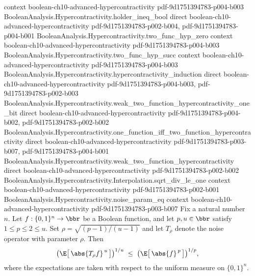\begin{theorem}
  {context}
  {boolean-ch10-advanced-hypercontractivity}
  {pdf-9d1751394783-p004-b003}
\proofstep
  {BooleanAnalysis.Hypercontractivity.holder_ineq_bool}
  {direct}
  {boolean-ch10-advanced-hypercontractivity}
  {pdf-9d1751394783-p002-b004,
    pdf-9d1751394783-p004-b001}
\proofstep
  {BooleanAnalysis.Hypercontractivity.two_func_hyp_zero}
  {context}
  {boolean-ch10-advanced-hypercontractivity}
  {pdf-9d1751394783-p004-b003}
\proofstep
  {BooleanAnalysis.Hypercontractivity.two_func_hyp_succ}
  {context}
  {boolean-ch10-advanced-hypercontractivity}
  {pdf-9d1751394783-p004-b003}
\proofstep
  {BooleanAnalysis.Hypercontractivity.hypercontractivity_induction}
  {direct}
  {boolean-ch10-advanced-hypercontractivity}
  {pdf-9d1751394783-p004-b003,
    pdf-9d1751394783-p002-b003}
\proofstep
  {BooleanAnalysis.Hypercontractivity.weak_two_function_hypercontractivity_one_bit}
  {direct}
  {boolean-ch10-advanced-hypercontractivity}
  {pdf-9d1751394783-p004-b002,
    pdf-9d1751394783-p002-b002}
\proofstep
  {BooleanAnalysis.Hypercontractivity.one_function_iff_two_function_hypercontractivity}
  {direct}
  {boolean-ch10-advanced-hypercontractivity}
  {pdf-9d1751394783-p003-b007,
    pdf-9d1751394783-p004-b001}
\proofstep
  {BooleanAnalysis.Hypercontractivity.weak_two_function_hypercontractivity}
  {direct}
  {boolean-ch10-advanced-hypercontractivity}
  {pdf-9d1751394783-p002-b002}
\proofstep
  {BooleanAnalysis.Hypercontractivity.Interpolation.sqrt_div_le_one}
  {context}
  {boolean-ch10-advanced-hypercontractivity}
  {pdf-9d1751394783-p002-b001}
\proofstep
  {BooleanAnalysis.Hypercontractivity.noise_param_eq}
  {context}
  {boolean-ch10-advanced-hypercontractivity}
  {pdf-9d1751394783-p003-b007}
Fix a natural number $n$. Let $f:\{0,1\}^n\to\bbr$ be a Boolean function, and let $p,u\in\bbr$ satisfy $1\le p\le
2\le u$. Set $\rho=\sqrt{(p-1)/(u-1)}$ and let $T_\rho$ denote the noise operator with
parameter $\rho$. Then
\[
  \bigl(\E\bigl[\,\abs{T_\rho f}^{\,u}\,\bigr]\bigr)^{1/u}
  \;\le\;
  \bigl(\E\bigl[\,\abs{f}^{\,p}\,\bigr]\bigr)^{1/p},
\]
where the expectations are taken with respect to the uniform measure on $\{0,1\}^n$.
\end{theorem}

